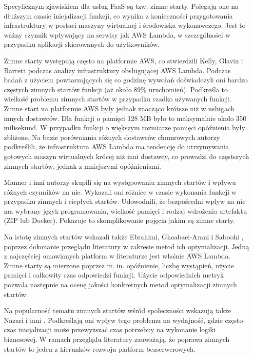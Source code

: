 Specyficznym zjawiskiem dla usług FaaS są tzw. zimne starty. 
Polegają one na dłuższym czasie inicjalizacji funkcji, co wynika z konieczności przygotowania infrastruktury w postaci maszyny wirtualnej i środowiska wykonawczego. 
Jest to ważny czynnik wpływający na serwisy jak AWS Lambda, w szczególności w przypadku aplikacji skierowanych do użytkowników.

Zimne starty występują często na platformie AWS, co stwierdzili Kelly, Glavin i Barrett \cite{9284261} podczas analizy infrastruktury obsługującej AWS Lambda. 
Podczas badań z użyciem powtarzających się co godzinę wywołań doświadczyli oni bardzo częstych zimnych startów funkcji (aż około 89\% uruchomień). 
Podkreśla to wielkość problemu zimnych startów w przypadku rzadko używanych funkcji. 
Zimne start na platformie AWS były jednak znacząco krótsze niż w usługach innych dostawców. 
Dla funkcji o pamięci 128 MB było to maksymalnie około 350 milisekund. 
W przypadku funkcji o większym rozmiarze pamięci opóźnienia były zbliżone. 
Na bazie porówniania różnych dostawców chmurowych autorzy podkreślili, że infrastruktura AWS Lambda ma tendencję do utrzymywania gotowych maszyn wirtualnych krócej niż inni dostawcy, co prowadzi do częstszych zimnych startów, jednak z mniejszymi opóźnieniami.

Manner i inni autorzy \cite{8605777} skupili się na występowaniu zimnych startów i wpływu różnych czynników na nie. 
Wykazali oni różnice w czasie wykonania funkcji w przypadku zimnych i ciepłych startów. 
Udowodnili, że bezpośredni wpływ na nie ma wybrany język programowania, wielkość pamięci i rodzaj wdrożenia artefaktu (ZIP lub Docker). 
Pokazuje to skomplikowanie pojęcia jakim są zimne starty.

Na istotę zimnych startów wskazali także Ebrahimi, Ghoabaei-Arani i Saboohi \cite{EBRAHIMI2024103115}, poprzez dokonanie przeglądu literatury w zakresie metod ich optymalizacji. 
Jedną z najczęściej omawianych platform w literaturze jest właśnie AWS Lambda. 
Zimne starty są mierzone poprzez m. in. opóźnienie, liczbę wystąpień, użycie pamięci i całkowity czas odpowiedzi funkcji. 
Użycie odpowiednich metryk pozwala następnie na ocenę jakości konkretnych metod optymalizacji zimnych startów.

Na popularność tematu zimnych startów wśród społeczności wskazują także Nazari i inni \cite{9732138}.
Podkreślają oni wpływ tego problemu na wydajność, gdzie często czas inicjalizacji może przewyższać czas potrzebny na wykonanie logiki biznesowej.
W ramach przeglądu literatury zauważają, że poprawa zimnych startów to jeden z kierunków rozwoju platform bezserwerowych.

